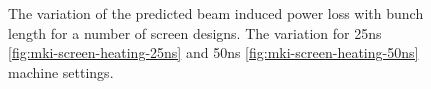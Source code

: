 \begin{figure}
\caption{The variation of the predicted beam induced power loss with bunch length for a number of screen designs. The variation for 25ns \ref{fig:mki-screen-heating-25ns} and 50ns \ref{fig:mki-screen-heating-50ns} machine settings.}
\label{fig:mki-screens-heating-bunch-length}
\end{figure}
